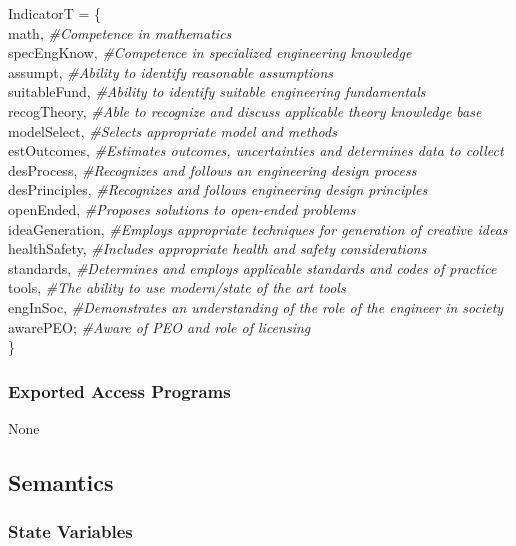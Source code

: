\documentclass[12pt]{article}
\begin{document}
IndicatorT = \{\\
    math, \textit{\#Competence in mathematics}\\
    specEngKnow, \textit{\#Competence in specialized engineering knowledge}\\
    assumpt, \textit{\#Ability to identify reasonable assumptions}\\
    suitableFund, \textit{\#Ability to identify suitable engineering fundamentals}\\
    recogTheory, \textit{\#Able to recognize and discuss applicable theory knowledge base}\\
    modelSelect, \textit{\#Selects appropriate model and methods}\\
    estOutcomes, \textit{\#Estimates outcomes, uncertainties and determines data to collect}\\
    desProcess, \textit{\#Recognizes and follows an engineering design process}\\
    desPrinciples, \textit{\#Recognizes and follows engineering design principles}\\
    openEnded, \textit{\#Proposes solutions to open-ended problems}\\
    ideaGeneration, \textit{\#Employs appropriate techniques for generation of creative ideas}\\
    healthSafety, \textit{\#Includes appropriate health and safety considerations}\\
    standards, \textit{\#Determines and employs applicable standards and codes of practice}\\
    tools, \textit{\#The ability to use modern/state of the art tools}\\
    engInSoc, \textit{\#Demonstrates an understanding of the role of the engineer in society}\\
    awarePEO; \textit{\#Aware of PEO and role of licensing}\\
\}

\subsubsection* {Exported Access Programs}

None

\subsection* {Semantics}

\subsubsection* {State Variables}
\end{document}
